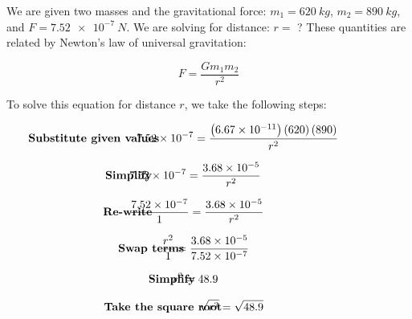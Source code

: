 \documentclass{article}
\begin{document}
\Solution We are given two masses and the gravitational force: $m_1 = \SI{620}{kg}$, $m_2 = \SI{890}{kg}$, and $F = \SI{7.52e-7}{N}$. We are solving for distance: $r=$ ? These quantities are related by Newton's law of universal gravitation:

\begin{equation*}
    F = \frac{G m_1 m_2}{r^2}
\end{equation*}

To solve this equation for distance $r$, we take the following steps:

\begin{align*}
    \hspace{-3.5em} & \textbf{Substitute given values} & \hspace{-3em} &
    \SI{7.52e-7}{} = \frac{
        \left(\SI{6.67e-11}{}\right)
        \left(620\right)
        \left(890\right)
    }{r^2}
\end{align*}

\begin{align*}
    \hspace{-3.5em} & \textbf{Simplify} & \hspace{-3em} &
    \SI{7.52e-7}{} = \frac{\SI{3.68e-5}{}}{r^2}
\end{align*}

\begin{align*}
    \hspace{-3.5em} & \textbf{Re-write} & \hspace{-3em} &
    \frac{\SI{7.52e-7}{}}{1} = \frac{\SI{3.68e-5}{}}{r^2}
\end{align*}

\begin{align*}
    \hspace{-3.5em} & \textbf{Swap terms} & \hspace{-3em} &
    \frac{r^2}{1} = \frac{\SI{3.68e-5}{}}{\SI{7.52e-7}{}}
\end{align*}


\begin{align*}
    \hspace{-3.5em} & \textbf{Simplify} & \hspace{-3em} &
    r^2 = 48.9
\end{align*}

\begin{align*}
    \hspace{-3.5em} & \textbf{Take the square root} & \hspace{-3em} &
    \sqrt{r^2} = \sqrt{48.9}
\end{align*}
\end{document}

